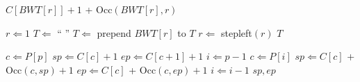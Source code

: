 \documentclass{article}
\begin{document}
\newcommand{\stepleft}{\ensuremath{\mbox{\sc stepleft}}}
\newcommand{\unpermute}{\ensuremath{\mbox{\sc unpermute}}}
\newcommand{\exactmatch}{\ensuremath{\mbox{\sc exactmatch}}}

\begin{algorithm}[stepleft]
\caption{$\stepleft(r)$}\label{alg:stepleft} 
\begin{algorithmic}[1] 
\RETURN $C[BWT[r]] + 1 $ + Occ$(BWT[r], r)$
\end{algorithmic} 
\end{algorithm} 

\begin{algorithm}[unpermute]
\caption{$\unpermute$}\label{alg:unpermute} 
\begin{algorithmic}[1] 
\STATE $r \Leftarrow 1$
\STATE $T \Leftarrow $ `` ''
\STATE $T \Leftarrow $ prepend $BWT[r]$ to $T$
\STATE $r \Leftarrow $ {\sc stepleft}$(r)$
\ENDWHILE
\RETURN $T$
\end{algorithmic} 
\end{algorithm} 

\begin{algorithm}[exactmatch]
\caption{$\exactmatch(P[1,p])$}\label{alg:exactmatch} 
\begin{algorithmic}[1] 
\STATE $c \Leftarrow P[p]$
\STATE $sp \Leftarrow C[c]+1$
\STATE $ep \Leftarrow C[c+1]+1$
\STATE $i \Leftarrow p - 1$
\STATE $c \Leftarrow P[i]$
\STATE $sp \Leftarrow C[c]$ + Occ$(c, sp) + 1$
\STATE $ep \Leftarrow C[c]$ + Occ$(c, ep) + 1$
\STATE $i \Leftarrow i-1$
\ENDWHILE
\RETURN $sp, ep$
\end{algorithmic} 
\end{algorithm} 
\end{document}
